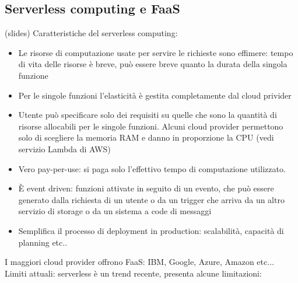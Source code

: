 \documentclass{article}
\begin{document}
\subsection{Serverless computing e FaaS}
(slides)
Caratteristiche del serverless computing:
\begin{itemize}
\item Le risorse di computazione usate per servire le richieste sono effimere: tempo di vita delle risorse è breve, può essere breve quanto la durata della singola funzione
\item Per le singole funzioni l'elasticità è gestita completamente dal cloud privider
\item Utente può specificare solo dei requisiti su quelle che sono la quantità di risorse allocabili per le singole funzioni. Alcuni cloud provider permettono solo di scegliere la memoria RAM e danno in proporzione la CPU (vedi servizio Lambda di AWS)
\item Vero pay-per-use: si paga solo l'effettivo tempo di computazione utilizzato.
\item È event driven: funzioni attivate in seguito di un evento, che può essere generato dalla richiesta di un utente o da un trigger che arriva da un altro servizio di storage o da un sistema a code di messaggi
\item Semplifica il processo di deployment in production: scalabilità, capacità di planning etc..
\end{itemize}
I maggiori cloud provider offrono FaaS: IBM, Google, Azure, Amazon etc...\\ Limiti attuali: serverless è un trend recente, presenta alcune limitazioni:
\end{document}
